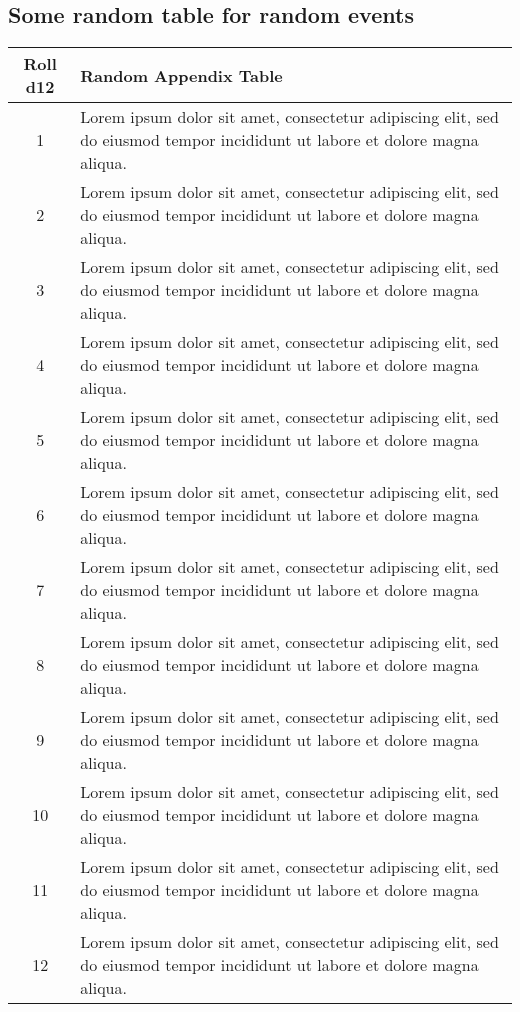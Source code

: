 \documentclass{zine}
\begin{document}
\subsection{\centering Some random table for random events}
\begin{table}[!htbp]
    \centering
    \begin{tabular}{|c|p{14.5cm}|}
        \hline
        \textbf{Roll d12} & \textbf{Random Appendix Table} \\
        \hline
        \hline
        1 &   Lorem ipsum dolor sit amet, consectetur adipiscing elit, sed do eiusmod tempor incididunt ut labore et dolore magna aliqua.\\
        2 &   Lorem ipsum dolor sit amet, consectetur adipiscing elit, sed do eiusmod tempor incididunt ut labore et dolore magna aliqua.\\
        3 &   Lorem ipsum dolor sit amet, consectetur adipiscing elit, sed do eiusmod tempor incididunt ut labore et dolore magna aliqua.\\
        4 &   Lorem ipsum dolor sit amet, consectetur adipiscing elit, sed do eiusmod tempor incididunt ut labore et dolore magna aliqua.\\
        5 &   Lorem ipsum dolor sit amet, consectetur adipiscing elit, sed do eiusmod tempor incididunt ut labore et dolore magna aliqua.\\
        6 &   Lorem ipsum dolor sit amet, consectetur adipiscing elit, sed do eiusmod tempor incididunt ut labore et dolore magna aliqua.\\
        7 &   Lorem ipsum dolor sit amet, consectetur adipiscing elit, sed do eiusmod tempor incididunt ut labore et dolore magna aliqua.\\
        8 &   Lorem ipsum dolor sit amet, consectetur adipiscing elit, sed do eiusmod tempor incididunt ut labore et dolore magna aliqua.\\
        9 &   Lorem ipsum dolor sit amet, consectetur adipiscing elit, sed do eiusmod tempor incididunt ut labore et dolore magna aliqua.\\
        10 &  Lorem ipsum dolor sit amet, consectetur adipiscing elit, sed do eiusmod tempor incididunt ut labore et dolore magna aliqua.\\
        11 &  Lorem ipsum dolor sit amet, consectetur adipiscing elit, sed do eiusmod tempor incididunt ut labore et dolore magna aliqua.\\
        12 &  Lorem ipsum dolor sit amet, consectetur adipiscing elit, sed do eiusmod tempor incididunt ut labore et dolore magna aliqua.\\
        \hline
    \end{tabular}
    \label{tab:monster-descriptions}
\end{table}
\end{document}
